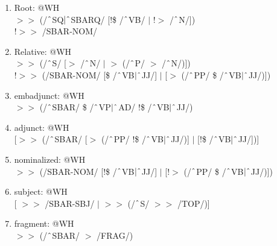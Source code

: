 \begin{enumerate}
\begin{enumerate}
            \item Root: @WH \\
            $>\!\!>$ (/$\string^$SQ$|\string^$SBARQ/ [!\$ /$\string^$VB/ $|$ !$>$ /$\string^$N/]) \\
            !$>\!\!>$ /SBAR-NOM/
            
            \item Relative: @WH \\
            $>\!\!>$ (/$\string^$S/ [$>$ /$\string^$N/ $|$ $>$ (/$\string^$P/ $>$ /$\string^$N/)]) \\
            !$>\!\!>$ (/SBAR-NOM/ [\$ /$\string^$VB$|\string^$JJ/] $|$ [$>$ (/$\string^$PP/ \$ /$\string^$VB$|\string^$JJ/)])

            \item embadjunct: @WH\\ 
            $>\!\!>$ (/$\string^$SBAR/ \$ /$\string^$VP$|\string^$AD/ !\$ /$\string^$VB$|\string^$JJ/)

            \item adjunct: @WH\\
            {}[$>\!\!>$ (/$\string^$SBAR/ [$>$ (/$\string^$PP/ !\$ /$\string^$VB$|\string^$JJ/)] $|$ [!\$ /$\string^$VB$|\string^$JJ/])]

            \item nominalized: @WH \\
            $>\!\!>$ (/SBAR-NOM/ [!\$ /$\string^$VB$|\string^$JJ/] $|$ [!$>$ (/$\string^$PP/ \$ /$\string^$VB$|\string^$JJ/)])

            \item subject: @WH \\
            {}[ $>\!\!>$ /SBAR-SBJ/ $|$ $>\!\!>$ (/$\string^$S/ $>\!\!>$ /TOP/)]

            \item fragment: @WH \\
            $>\!\!>$ (/$\string^$SBAR/ $>$ /FRAG/)
            

\end{enumerate}
\end{enumerate}
